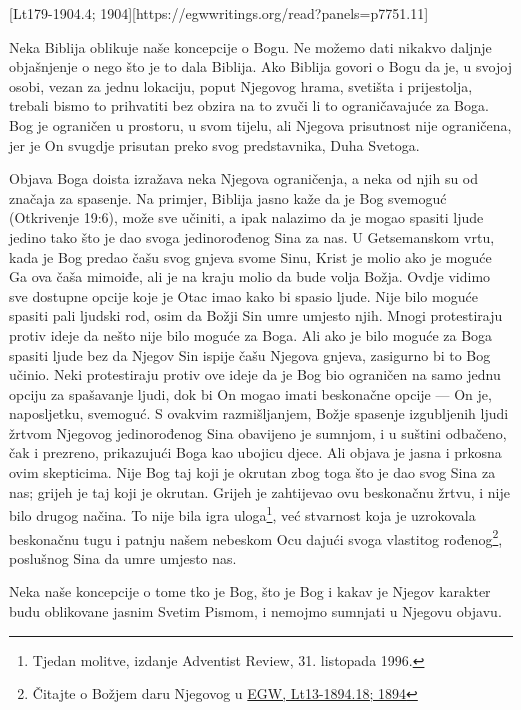 [Lt179-1904.4; 1904][https://egwwritings.org/read?panels=p7751.11]

Neka Biblija oblikuje naše koncepcije o Bogu. Ne možemo dati nikakvo daljnje objašnjenje o  nego što je to dala Biblija. Ako Biblija govori o Bogu da je, u svojoj osobi, vezan za jednu lokaciju, poput Njegovog hrama, svetišta i prijestolja, trebali bismo to prihvatiti bez obzira na to zvuči li to ograničavajuće za Boga. Bog je ograničen u prostoru, u svom tijelu, ali Njegova prisutnost nije ograničena, jer je On svugdje prisutan preko svog predstavnika, Duha Svetoga.

Objava Boga doista izražava neka Njegova ograničenja, a neka od njih su od značaja za spasenje. Na primjer, Biblija jasno kaže da je Bog svemoguć (Otkrivenje 19:6), može sve učiniti, a ipak nalazimo da je mogao spasiti ljude jedino tako što je dao svoga jedinorođenog Sina za nas. U Getsemanskom vrtu, kada je Bog predao čašu svog gnjeva svome Sinu, Krist je molio ako je moguće Ga ova čaša mimoiđe, ali je na kraju molio da bude volja Božja. Ovdje vidimo sve dostupne opcije koje je Otac imao kako bi spasio ljude. Nije bilo moguće spasiti pali ljudski rod, osim da Božji Sin umre umjesto njih. Mnogi protestiraju protiv ideje da nešto nije bilo moguće za Boga. Ali ako je bilo moguće za Boga spasiti ljude bez da Njegov Sin ispije čašu Njegova gnjeva, zasigurno bi to Bog učinio. Neki protestiraju protiv ove ideje da je Bog bio ograničen na samo jednu opciju za spašavanje ljudi, dok bi On mogao imati beskonačne opcije — On je, naposljetku, svemoguć. S ovakvim razmišljanjem, Božje spasenje izgubljenih ljudi žrtvom Njegovog jedinorođenog Sina obavijeno je sumnjom, i u suštini odbačeno, čak i prezreno, prikazujući Boga kao ubojicu djece. Ali objava je jasna i prkosna ovim skepticima. Nije Bog taj koji je okrutan zbog toga što je dao svog Sina za nas; grijeh je taj koji je okrutan. Grijeh je zahtijevao ovu beskonačnu žrtvu, i nije bilo drugog načina. To nije bila igra uloga\footnote{Tjedan molitve, izdanje Adventist Review, 31. listopada 1996.}, već stvarnost koja je uzrokovala beskonačnu tugu i patnju našem nebeskom Ocu dajući svoga vlastitog rođenog\footnote{Čitajte o Božjem daru Njegovog  u \href{https://egwwritings.org/?ref=en_Lt13-1894.18&para=5486.24}{{EGW, Lt13-1894.18; 1894}}}, poslušnog Sina da umre umjesto nas.

Neka naše koncepcije o tome tko je Bog, što je Bog i kakav je Njegov karakter budu oblikovane jasnim Svetim Pismom, i nemojmo sumnjati u Njegovu objavu.

